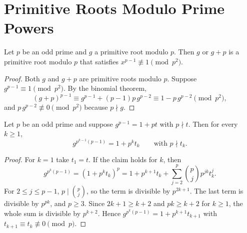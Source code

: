 \section{Primitive Roots Modulo Prime Powers}

\begin{lemma}\label{lem:primitive_root_lift_choice}
    Let $p$ be an odd prime and $g$ a primitive root modulo $p$. Then $g$ or $g + p$ is a primitive root modulo $p$ that satisfies $x^{p-1} \not\equiv 1 \pmod{p^2}$.
\end{lemma}
\begin{proof}
    Both $g$ and $g + p$ are primitive roots modulo $p$. Suppose $g^{p-1} \equiv 1 \pmod{p^2}$. By the binomial theorem,
    \begin{equation*}
        (g + p)^{p-1} \equiv g^{p-1} + (p-1)p\,g^{p-2} \equiv 1 - p\,g^{p-2} \pmod{p^2},
    \end{equation*}
    and $p\,g^{p-2} \not\equiv 0 \pmod{p^2}$ because $p \nmid g$.
\end{proof}

\begin{lemma}\label{lem:lifting_powers}
    Let $p$ be an odd prime and suppose $g^{p-1} = 1 + pt$ with $p \nmid t$. Then for every $k \ge 1$,
    \begin{equation*}
        g^{p^{k-1}(p-1)} = 1 + p^k t_k \qquad \text{with } p \nmid t_k.
    \end{equation*}
\end{lemma}
\begin{proof}
    For $k = 1$ take $t_1 = t$. If the claim holds for $k$, then
    \begin{equation*}
        g^{p^{k}(p-1)} = (1 + p^k t_k)^p = 1 + p^{k+1} t_k + \sum_{j=2}^{p} \binom{p}{j} p^{jk} t_k^j.
    \end{equation*}
    For $2 \le j \le p - 1$, $p \mid \binom{p}{j}$, so the term is divisible by $p^{2k+1}$. The last term is divisible by $p^{pk}$, and $p \ge 3$. Since $2k + 1 \ge k + 2$ and $pk \ge k + 2$ for $k \ge 1$, the whole sum is divisible by $p^{k+2}$. Hence $g^{p^k(p-1)} = 1 + p^{k+1}t_{k+1}$ with $t_{k+1} \equiv t_k \not\equiv 0 \pmod p$.
\end{proof}

